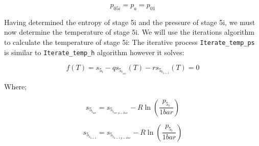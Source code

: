\documentclass[titlepage]{article}
\begin{document}
    \begin{equation}
        p_{05i} = p_{a} = p_{01}
    \end{equation}

    Having determined the entropy of stage 5i and the pressure of stage 5i, we must now determine the temperature of stage 5i. We will use the iterations algorithm to calculate the temperature of stage 5i:
    The iterative process \verb|Iterate_temp_ps| is similar to \verb|Iterate_temp_h| algorithm however it solves:

    \begin{equation}
        f(T) = s_{5_{i}} - q s_{5_{i_{air}}}(T) - r s_{5_{i_{\lambda=1}}}(T) = 0
    \end{equation}

    Where;

    \begin{equation}
        s_{5_{i_{air}}} = s_{5_{i_{air, p=1 bar}}} - R \ln \left( \frac{p_{5_{i}}}{1 bar} \right)
    \end{equation}

    \begin{equation}
        s_{5_{i_{\lambda=1}}} = s_{5_{i_{\lambda=1, p=1 bar}}} - R \ln \left( \frac{p_{5_{i}}}{1 bar} \right)
    \end{equation}
\end{document}
